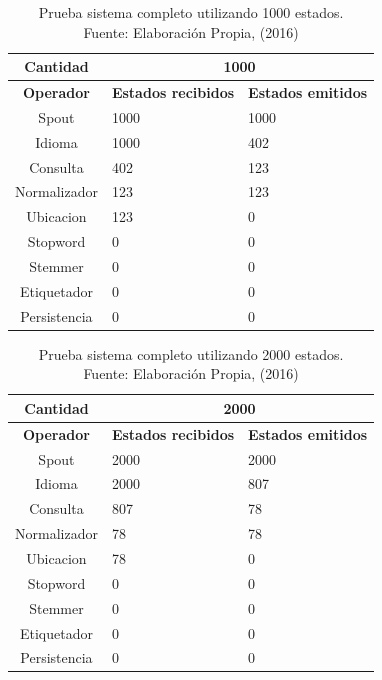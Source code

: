 \begin{table}[H]
\centering
\caption[Prueba sistema completo utilizando 1000 estados.]{Prueba sistema completo utilizando 1000 estados.\\Fuente: Elaboración Propia, (2016)}
\label{PruebaSistFull1000}
\begin{tabular}{|c|l|l|}
\hline
\textbf{Cantidad} & \multicolumn{2}{c|}{\textbf{1000}} \\ \hline
\textbf{Operador} & \multicolumn{1}{c|}{\textbf{Estados recibidos}} & \multicolumn{1}{c|}{\textbf{Estados emitidos}} \\ \hline
Spout & 1000 & 1000 \\ \hline
Idioma & 1000 & 402 \\ \hline
Consulta & 402 & 123 \\ \hline
Normalizador & 123 & 123 \\ \hline
Ubicacion & 123 & 0 \\ \hline
Stopword & 0 & 0 \\ \hline
Stemmer & 0 & 0 \\ \hline
Etiquetador & 0 & 0 \\ \hline
Persistencia & 0 & 0 \\ \hline
\end{tabular}
\end{table}

\begin{table}[H]
\centering
\caption[Prueba sistema completo utilizando 2000 estados.]{Prueba sistema completo utilizando 2000 estados.\\Fuente: Elaboración Propia, (2016)}
\label{PruebaSistFull2000}
\begin{tabular}{|c|l|l|}
\hline
\textbf{Cantidad} & \multicolumn{2}{c|}{\textbf{2000}} \\ \hline
\textbf{Operador} & \multicolumn{1}{c|}{\textbf{Estados recibidos}} & \multicolumn{1}{c|}{\textbf{Estados emitidos}} \\ \hline
Spout & 2000 & 2000 \\ \hline
Idioma & 2000 & 807 \\ \hline
Consulta & 807 & 78 \\ \hline
Normalizador & 78 & 78 \\ \hline
Ubicacion & 78 & 0 \\ \hline
Stopword & 0 & 0 \\ \hline
Stemmer & 0 & 0 \\ \hline
Etiquetador & 0 & 0 \\ \hline
Persistencia & 0 & 0 \\ \hline
\end{tabular}
\end{table}

